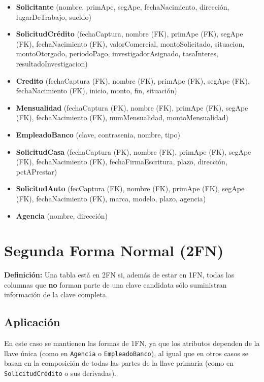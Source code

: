 \documentclass[12pt, a4paper]{article}
\begin{document}
\begin{itemize}[leftmargin=2cm, label={--}]
    \item \textbf{Solicitante} (nombre, primApe, segApe, fechaNacimiento, dirección, lugarDeTrabajo, sueldo)
    \item \textbf{SolicitudCrédito} (fechaCaptura, nombre (FK), primApe (FK), segApe (FK), fechaNacimiento (FK), valorComercial, montoSolicitado, situacion, montoOtorgado, periodoPago, investigadorAsignado, tasaInteres, resultadoInvestigacion)
    \item \textbf{Credito} (fechaCaptura (FK), nombre (FK), primApe (FK), segApe (FK), fechaNacimiento (FK), inicio, monto, fin, situación)
    \item \textbf{Mensualidad} (fechaCaptura (FK), nombre (FK), primApe (FK), segApe (FK), fechaNacimiento (FK), numMensualidad, montoMensualidad)
    \item \textbf{EmpleadoBanco} (clave, contrasenia, nombre, tipo)
    \item \textbf{SolicitudCasa} (fechaCaptura (FK), nombre (FK), primApe (FK), segApe (FK), fechaNacimiento (FK), fechaFirmaEscritura, plazo, dirección, pctAPrestar)
    \item \textbf{SolicitudAuto} (fecCaptura (FK), nombre (FK), primApe (FK), segApe (FK), fechaNacimiento (FK), marca, modelo, plazo, agencia)
    \item \textbf{Agencia} (nombre, dirección)
\end{itemize}

\section{Segunda Forma Normal (2FN)}

\textbf{Definición:} Una tabla está en 2FN si, además de estar en 1FN, todas las columnas que \textbf{no} forman parte de una clave candidata sólo suministran información de la clave completa.

\subsection*{Aplicación}

En este caso se mantienen las formas de 1FN, ya que los atributos dependen de la llave única (como en \texttt{Agencia} o \texttt{EmpleadoBanco}), al igual que en otros casos se basan en la composición de todas las partes de la llave primaria (como en \texttt{SolicitudCrédito} o sus derivadas).

\noindent
{}
\end{document}
